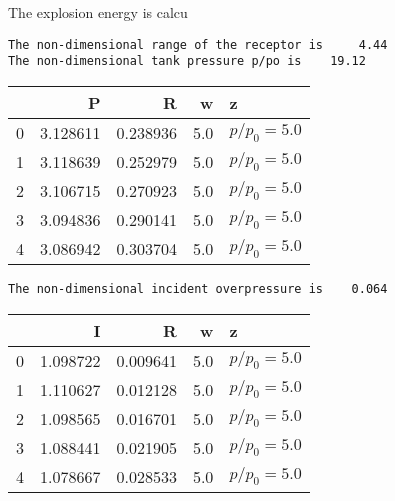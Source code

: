 \documentclass[10pt,parskip=half,
toc=sectionentrywithdots,
bibliography=totocnumbered,
captions=tableheading,numbers=noendperiod]{scrartcl}
\begin{document}
The explosion energy is calcu

\begin{lstlisting}[language={},postbreak={},numbers=none,xrightmargin=7pt,belowskip=5pt,aboveskip=5pt,breakindent=0pt]
The non-dimensional range of the receptor is     4.44
The non-dimensional tank pressure p/po is    19.12

\end{lstlisting}

\begin{table}[H]
\centering
\begin{adjustbox}{max width=\textwidth}
\begin{tabular}{lrrrl}
\toprule
{} &         P &         R &    w &            z \\
\midrule
0 &  3.128611 &  0.238936 &  5.0 &  $p/p_0=5.0$ \\
1 &  3.118639 &  0.252979 &  5.0 &  $p/p_0=5.0$ \\
2 &  3.106715 &  0.270923 &  5.0 &  $p/p_0=5.0$ \\
3 &  3.094836 &  0.290141 &  5.0 &  $p/p_0=5.0$ \\
4 &  3.086942 &  0.303704 &  5.0 &  $p/p_0=5.0$ \\
\bottomrule
\end{tabular}

\end{adjustbox}
\end{table}

\begin{lstlisting}[language={},postbreak={},numbers=none,xrightmargin=7pt,belowskip=5pt,aboveskip=5pt,breakindent=0pt]
The non-dimensional incident overpressure is    0.064

\end{lstlisting}

\begin{figure}[H]\begin{center}\end{center}\end{figure}

\begin{table}[H]
\centering
\begin{adjustbox}{max width=\textwidth}
\begin{tabular}{lrrrl}
\toprule
{} &         I &         R &    w &            z \\
\midrule
0 &  1.098722 &  0.009641 &  5.0 &  $p/p_0=5.0$ \\
1 &  1.110627 &  0.012128 &  5.0 &  $p/p_0=5.0$ \\
2 &  1.098565 &  0.016701 &  5.0 &  $p/p_0=5.0$ \\
3 &  1.088441 &  0.021905 &  5.0 &  $p/p_0=5.0$ \\
4 &  1.078667 &  0.028533 &  5.0 &  $p/p_0=5.0$ \\
\bottomrule
\end{tabular}

\end{adjustbox}
\end{table}
\end{document}
